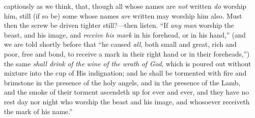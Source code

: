 captiously as we think, that, though all whose names are \emph{not}
written \emph{do} worship him, still (if so be) some whose names \emph{are}
written may worship him also. Must then the screw be driven tighter
still?—then listen. ``If \emph{any man} worship the beast, and
his image, and \emph{receive his mark} in his forehead, or in his
hand,'' (and we are told shortly before that ``he caused \emph{all},
both small and great, rich and poor, free and bond, to receive a mark
in their right hand or in their foreheads,'') the same \emph{shall
drink of the wine of the wrath of God}, which is poured out without
mixture into the cup of His indignation; and he shall be tormented
with fire and brimstone in the presence of the holy angels, and in the
presence of the Lamb, and the smoke of their torment ascendeth up for
ever and ever, and they have no rest day nor night who worship the
beast and his image, and whosoever receiveth the mark of his
name.''

